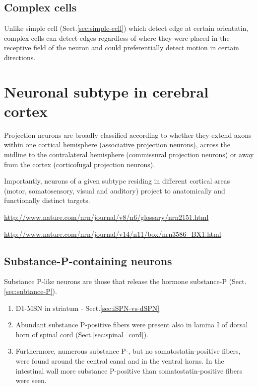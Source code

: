 \subsection{Complex cells}
\label{sec:complex-cell}

Unlike simple cell (Sect.\ref{sec:simple-cell}) which detect edge at certain
orientatin, complex cells can detect edges regardless of where they were placed
in the receptive field of the neuron and could preferentially detect motion in
certain directions.

\section{Neuronal subtype in cerebral cortex}
\label{sec:neocortical-projection-neurons}

Projection neurons are broadly classified according to whether they extend axons
within one cortical hemisphere (associative projection neurons), across the
midline to the contralateral hemisphere (commissural projection neurons) or away
from the cortex (corticofugal projection neurons).

Importantly, neurons of a given subtype residing in different cortical areas
(motor, somatosensory, visual and auditory) project to anatomically and
functionally distinct targets.


\url{http://www.nature.com/nrn/journal/v8/n6/glossary/nrn2151.html}

\url{http://www.nature.com/nrn/journal/v14/n11/box/nrn3586_BX1.html}

\subsection{Substance-P-containing neurons}
\label{sec:substance-P-like-neuron}

Substance P-like neurons are those that release the hormone substance-P
(Sect.\ref{sec:subtance-P}).

\begin{enumerate}

  \item D1-MSN in striatum - Sect.\ref{sec:iSPN-vs-dSPN}  


  \item Abundant substance P-positive fibers were present also in lamina I 
of dorsal horn of spinal cord (Sect.\ref{sec:spinal_cord}).
  
  \item Furthermore, numerous substance P-, but no somatostatin-positive
  fibers, were found around the central canal and in the ventral horns. 
In the intestinal wall more substance P-positive than somatostatin-positive
fibers were seen.

\end{enumerate}

